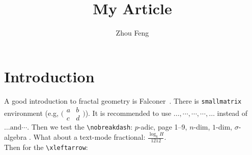 \documentclass[a4paper,12pt]{amsart}
\title[small title]{My Article}
\author{Zhou Feng}
\theoremstyle{plain}
\theoremstyle{definition}
\theoremstyle{remark}
\numberwithin{equation}{section} %
\newcommand{\Ndash}{\nobreakdash--}
\newcommand{\sigmaAlg}{$\sigma$\nobreakdash-algebra }
\newcommand{\ndiml}[1][n]{$#1$\nobreakdash-dim}
\newcommand{\padic}{$p$\nobreakdash-adic}
\begin{document}
%
\maketitle

%
%
%
%
%

\section{Introduction}\label{sec:intro}
A good introduction to fractal geometry is Falconer~\cite{Falconer2003}. There is \verb|smallmatrix| environment (e.g, $\big(\begin{smallmatrix}
			a & b\\ c&d
		\end{smallmatrix}\big)$). It is recommended to use $ \dotsc, \dotsb, \dotsm, \dotsi, \dotso $ instead of $ \ldots \text{and} \cdots$. Then we test the \verb|\nobreakdash|: \padic, page 1\Ndash9, \ndiml, \ndiml[1], \sigmaAlg.
What about a text-mode fractional: $ \tfrac{\log_{k} H}{1212} $.\\[20pt]
Then for the \verb|\xleftarrow|:
\end{document}

